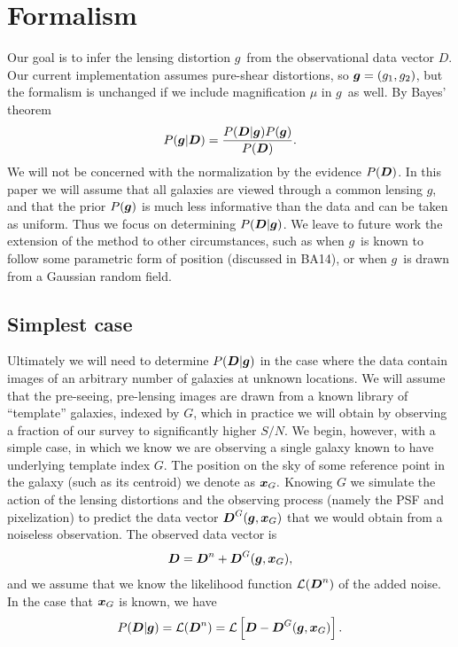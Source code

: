 \documentclass[11pt,preprint,flushrt]{aastex}
\newcommand{\vecD}{\mbox{\boldmath $D$}}
\newcommand{\vecg}{\mbox{\boldmath $g$}}
\newcommand{\vecx}{\mbox{\boldmath $x$}}
\newcommand{\likeli}{\mbox{$\mathcal{L}$}}
\newcommand\edit[1]{#1}
\begin{document}
\section{Formalism}
\label{derivations}
Our goal is to infer the lensing distortion \vecg\ from the
observational data vector \vecD.  Our current implementation assumes
pure-shear distortions, so $\vecg=(g_1,g_2)$, but the formalism is
unchanged if we include magnification $\mu$ in \vecg\ as well.  By
Bayes' theorem
\begin{equation}
P(\vecg | \vecD) = \frac{P(\vecD | \vecg) P(\vecg)}{P(\vecD)}.
\end{equation}
We will not be concerned with the normalization by the
evidence $P(\vecD)$.  \edit{In this paper we will assume that all galaxies
are viewed through a common lensing \vecg, and that the prior
$P(\vecg)$ is much less informative than the data and can be taken as
uniform.  Thus we focus on determining $P(\vecD | \vecg)$.  We leave
to future work the extension of the method to other circumstances,
such as when \vecg\ is known to follow some parametric form of
position (discussed in BA14), or when \vecg\ is drawn from a Gaussian
random field.}


\subsection{Simplest case}
Ultimately we will need to determine $P(\vecD | \vecg)$ in the case
where the data contain images of an arbitrary number of galaxies at
unknown locations.  We will assume that the pre-seeing, pre-lensing
images are drawn from a known library of ``template'' galaxies,
indexed by $G$, which in practice we will obtain by observing a
fraction of our survey to significantly higher $S/N.$
We begin, however, with a simple case, in which we
know we are observing a single galaxy known to have underlying
template index $G$.  The
position on the sky of some reference 
point in the galaxy (such as its centroid) we denote as $\vecx_G.$
Knowing $G$ we simulate the action of the lensing distortions and the
observing process (namely the PSF and pixelization)
to predict the data vector $\vecD^G(\vecg,\vecx_G)$ that we would obtain
from a noiseless observation.  The observed data vector is
\begin{equation}
\vecD = \vecD^n + \vecD^G(\vecg, \vecx_G),
\label{sumdata}
\end{equation}
and we assume that we know the likelihood function $\likeli(\vecD^n)$
of the added noise.
In the case that $\vecx_G$ is known, we have
\begin{equation}
P(\vecD | \vecg) = \likeli(\vecD^n) = \likeli\left[\vecD - \vecD^G(\vecg,\vecx_G)\right].
\end{equation}
\end{document}
